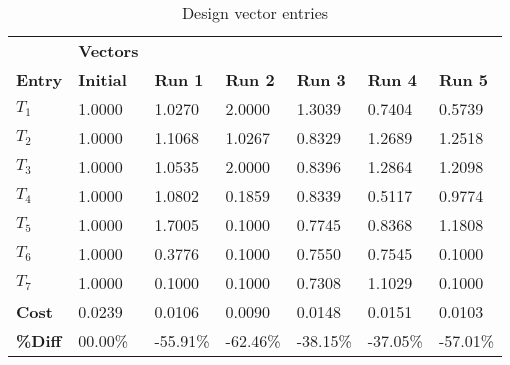 \begin{table}[H]
\centering
\begin{tabular}{lllllll}
\textbf{} & \cellcolor[HTML]{EFEFEF}\textbf{Vectors} & \textbf{} & \textbf{} & \textbf{} & \textbf{} & \textbf{} \\
\rowcolor[HTML]{EFEFEF} \cellcolor[HTML]{EFEFEF}\textbf{Entry} & \cellcolor[HTML]{EFEFEF}\textbf{Initial} & \cellcolor[HTML]{EFEFEF}\textbf{Run 1} & \cellcolor[HTML]{EFEFEF}\textbf{Run 2} & \cellcolor[HTML]{EFEFEF}\textbf{Run 3} & \cellcolor[HTML]{EFEFEF}\textbf{Run 4} & \cellcolor[HTML]{EFEFEF}\textbf{Run 5} \\
$T_1$ & 1.0000 & 1.0270 & 2.0000 & 1.3039 & 0.7404 & 0.5739 \\
$T_2$ & 1.0000 & 1.1068 & 1.0267 & 0.8329 & 1.2689 & 1.2518 \\
$T_3$ & 1.0000 & 1.0535 & 2.0000 & 0.8396 & 1.2864 & 1.2098 \\
$T_4$ & 1.0000 & 1.0802 & 0.1859 & 0.8339 & 0.5117 & 0.9774 \\
$T_5$ & 1.0000 & 1.7005 & 0.1000 & 0.7745 & 0.8368 & 1.1808 \\
$T_6$ & 1.0000 & 0.3776 & 0.1000 & 0.7550 & 0.7545 & 0.1000 \\
$T_7$ & 1.0000 & 0.1000 & 0.1000 & 0.7308 & 1.1029 & 0.1000 \\
\rowcolor[HTML]{EFEFEF} 
\cellcolor[HTML]{EFEFEF}\textbf{Cost} & \cellcolor[HTML]{EFEFEF}0.0239 & 0.0106 & 0.0090 & 0.0148 & 0.0151 & 0.0103 \\
\rowcolor[HTML]{EFEFEF} 
\cellcolor[HTML]{EFEFEF}\textbf{\%Diff} & \cellcolor[HTML]{EFEFEF} 00.00\% &-55.91\% & -62.46\% & -38.15\% & -37.05\% & -57.01\% \\
\end{tabular}
\caption{Design vector entries}
\label{tab:DesignVectorEntries}
\end{table}